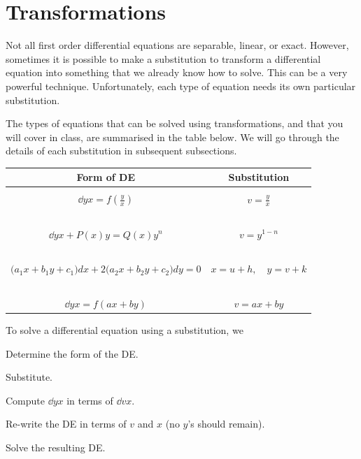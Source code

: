 \documentclass{book}
\begin{document}


\newpage
\section{Transformations}

Not all first order differential equations are separable, linear, or
exact.  However, sometimes it is possible to make a substitution to
transform a differential equation into something that we already know
how to solve.  This can be a very powerful technique.  Unfortunately,
each type of equation needs its own particular substitution.

The types of equations that can be solved using transformations, and
that you will cover in class, are summarised in the table below.  We
will go through the details of each substitution in subsequent
subsections.

\begin{center}
  \begin{tabular}{cc}
    Form of DE & Substitution \\ \midrule \hspace{2in} & \hspace{2in} \\
    $\dd{y}{x} = f\left( \frac{y}{x} \right)$
      & $v = \frac{y}{x}$ \\ \ \\
    $\dd{y}{x} + P(x) y = Q(x)y^n$
      & $v = y^{1-n}$ \\ \ \\
    $\bigl(a_1 x + b_1 y + c_1\bigr)dx +2 \bigl(a_2 x + b_2 y + c_2\bigr)dy = 0$
      & $x = u+h, \quad y = v+k$ \\ \ \\
    $\dd{y}{x} = f(ax+by)$
      & $v = ax + by$
  \end{tabular}
\end{center}

To solve a differential equation using a substitution, we
\begin{enumerate*}
\item Determine the form of the DE.
\item Substitute.
\item Compute $\dd{y}{x}$ in terms of $\dd{v}{x}$.
\item Re-write the DE in terms of $v$ and $x$ (no $y$'s should remain).
\item Solve the resulting DE.
\end{enumerate*}
\end{document}
